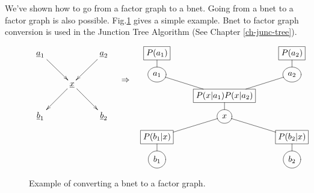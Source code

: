 We've shown
how to go from a factor graph
to a bnet.
Going from a
bnet to a factor graph
is also possible.
Fig.\ref{fig-bnet-2-fg}
gives a simple example.
Bnet  to factor
graph conversion
is used in the Junction Tree
Algorithm (See Chapter \ref{ch-junc-tree}).
\begin{figure}[h!]
$$
\begin{array}{ccc}
\xymatrix{
\rva_1\ar[dr]
&
&\rva_2\ar[dl]
\\
&\rvx\ar[dr]\ar[dl]
\\
\rvb_1
&
&\rvb_2
}
&
\xymatrix{\\
\rdart}
&
\xymatrix@R=.7pc{
*+[F]{P(a_1)}\ar@{-}[d]
&&
*+[F]{P(a_2)}\ar@{-}[d]
\\
*++[o][F]{a_1}\ar@{-}[dr]
&
&*++[o][F]{a_2}\ar@{-}[dl]
\\
&*+[F]{P(x|a_1)P(x|a_2)}\ar@{-}[d]
\\
&*++[o][F]{x}\ar@{-}[dr]\ar@{-}[dl]
\\
*+[F]{P(b_1|x)}\ar@{-}[d]
&
&*+[F]{P(b_2|x)}\ar@{-}[d]
\\
*++[o][F]{b_1}
&
&*++[o][F]{b_2}
}
\end{array}
$$
\caption{
Example
of converting a bnet
to a factor graph.}
\label{fig-bnet-2-fg}
\end{figure}





